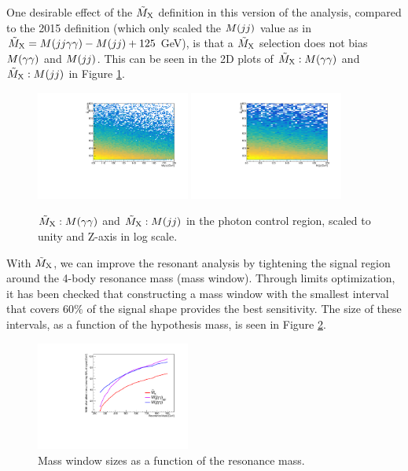 One desirable effect of the $\tilde{M}_{\mathrm{X}}$ definition in this version of the analysis, compared to the 2015 definition (which only scaled the $M(jj)$ value as in $\tilde{M}_{\mathrm{X}} = M(jj\gamma\gamma) - M(jj) + 125$ GeV), is that a $\tilde{M}_{\mathrm{X}}$ selection does not bias $M(\gamma\gamma)$ and $M(jj)$. 
This can be seen in the 2D plots of $\tilde{M}_{\mathrm{X}}:M(\gamma\gamma)$ and $\tilde{M}_{\mathrm{X}}:M(jj)$ in Figure \ref{fig:mx2d}. 

\begin{figure}[h]
  \centering
  \includegraphics[width=0.45\textwidth]{figures/sec-window/mgg2d.pdf}\hfil
  \includegraphics[width=0.45\textwidth]{figures/sec-window/mjj2d.pdf}\hfil
  \caption{$\tilde{M}_{\mathrm{X}}:M(\gamma\gamma)$ and $\tilde{M}_{\mathrm{X}}:M(jj)$ in the photon control region, scaled to unity and Z-axis in log scale. }
  \label{fig:mx2d}
\end{figure}

With $\tilde{M}_{\mathrm{X}}$, we can improve the resonant analysis by tightening the signal region around the 4-body resonance mass (mass window). 
Through limits optimization, it has been checked that constructing a mass window with the smallest interval that covers $60\%$ of the signal shape provides the best sensitivity. 
The size of these intervals, as a function of the hypothesis mass, is seen in Figure \ref{fig:masswindowwidths}. 

\begin{figure}[h]
  \centering
  \includegraphics[width=0.45\textwidth]{figures/sec-window/width_60_prime.pdf}\hfil

  \caption{Mass window sizes as a function of the resonance mass. }
  \label{fig:masswindowwidths}
\end{figure}

